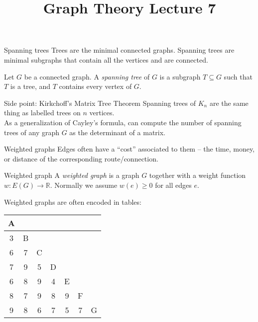 \documentclass{beamer}
\title{Graph Theory Lecture 7}
\begin{document}
\begin{frame}{Spanning trees}
Trees are the minimal connected graphs.  Spanning trees are minimal subgraphs that contain all the vertices and are connected.
  \begin{definition}Let $G$ be a connected graph.  A \emph{spanning tree} of $G$ is a subgraph $T\subseteq G$ such that $T$ is a tree, and $T$ contains every vertex of $G$.
    \end{definition}
  \begin{block}{Side point: Kirkchoff's Matrix Tree Theorem}
    Spanning trees of $K_n$ are the same thing as labelled trees on $n$ vertices. \\
As a generalization of Cayley's formula, can compute the number of spanning trees of any graph $G$ as the determinant of a matrix.
    \end{block}

\end{frame}

\begin{frame}{Weighted graphs}
Edges often have a ``cost'' associated to them -- the time, money, or distance of the corresponding route/connection.

  \begin{definition}{Weighted graph}
    A \emph{weighted graph} is a graph $G$ together with a weight function $w:E(G)\to \mathbb{R}.$  Normally we assume $w(e)\geq 0$ for all edges $e$.
  \end{definition}

  Weighted graphs are often encoded in tables: 
\begin{center}
  \begin{tabular}{c|c|c|c|c|c|c}
    A &   &   &   &   &   & \\ \hline
    3 & B &   &   &   &   & \\ \hline
    6 & 7 & C &   &   &   & \\ \hline
    7 & 9 & 5 & D &   &   & \\ \hline
    6 & 8 & 9 & 4 & E &   & \\ \hline
    8 & 7 & 9 & 8 & 9 & F & \\ \hline
    9 & 8 & 6 & 7 & 5 & 7 & G        
    \end{tabular}
  \end{center}
  \end{frame}
\end{document}
